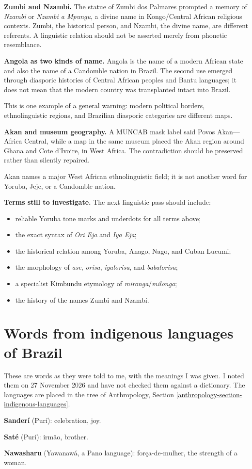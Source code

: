 \medskip\noindent
{\bf Zumbi and Nzambi.}
The statue of Zumbi dos Palmares prompted a
memory of \emph{Nzambi} or
\emph{Nzambi a Mpungu}, a divine name in
Kongo/Central African religious
contexts. Zumbi, the historical person, and
Nzambi, the divine name, are
different referents. A linguistic relation
should not be asserted merely
from phonetic resemblance.

\medskip\noindent
{\bf Angola as two kinds of name.}
Angola is the name of a modern African state
and also the name of a Candomble
nation in Brazil. The second use emerged
through diasporic histories of
Central African peoples and Bantu languages;
it does not mean that the modern
country was transplanted intact into Brazil.

This is one example of a general warning:
modern political borders,
ethnolinguistic regions, and Brazilian
diasporic categories are different
maps.

\medskip\noindent
{\bf Akan and museum geography.}
A MUNCAB mask label said Povos Akan---Africa
Central, while a map in the
same museum placed the Akan region around
Ghana and Cote d'Ivoire, in West
Africa. The contradiction should be preserved
rather than silently repaired.

Akan names a major West African
ethnolinguistic field; it is not another word
for Yoruba, Jeje, or a Candomble nation.

\medskip\noindent
{\bf Terms still to investigate.}
The next linguistic pass should include:
\begin{itemize}
\item reliable Yoruba tone marks and
      underdots for all terms above;
\item the exact syntax of \emph{Ori Eja} and
      \emph{Iya Eja};
\item the historical relation among Yoruba,
      Anago, Nago, and Cuban Lucumi;
\item the morphology of \emph{ase},
      \emph{orisa}, \emph{iyalorisa}, and
\emph{babalorisa};
\item a specialist Kimbundu etymology of
      \emph{mironga}/\emph{milonga};
\item the history of the names Zumbi and
      Nzambi.
\end{itemize}

\section{Words from indigenous languages of
Brazil}
\label{section-indigenous-words}

These are words as they were told to me,
with the meanings I was given. I noted them
on 27 November 2026 and have not checked
them against a dictionary. The languages
are placed in the tree of Anthropology,
Section
\ref{anthropology-section-indigenous-languages}.

\medskip\noindent
{\bf Sanderí} (Purí): celebration, joy.

\medskip\noindent
{\bf Saté} (Purí): irmão, brother.

\medskip\noindent
{\bf Nawasharu} (Yawanawá, a Pano
language): força-de-mulher, the strength of
a woman.





